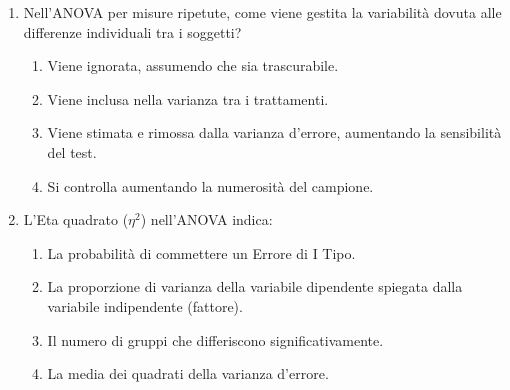 \documentclass[12pt, a4paper]{article}
\begin{document}
\begin{enumerate}[resume]
    \item Nell'ANOVA per misure ripetute, come viene gestita la variabilità dovuta alle differenze individuali tra i soggetti?
    \begin{enumerate}
        \item Viene ignorata, assumendo che sia trascurabile.
        \item Viene inclusa nella varianza tra i trattamenti.
        \item Viene stimata e rimossa dalla varianza d'errore, aumentando la sensibilità del test.
        \item Si controlla aumentando la numerosità del campione.
    \end{enumerate}
    \vspace{0.3cm}

    \item L'Eta quadrato ($\eta^2$) nell'ANOVA indica:
    \begin{enumerate}
        \item La probabilità di commettere un Errore di I Tipo.
        \item La proporzione di varianza della variabile dipendente spiegata dalla variabile indipendente (fattore).
        \item Il numero di gruppi che differiscono significativamente.
        \item La media dei quadrati della varianza d'errore.
    \end{enumerate}
    \vspace{0.3cm}
\end{enumerate}

\end{document}
